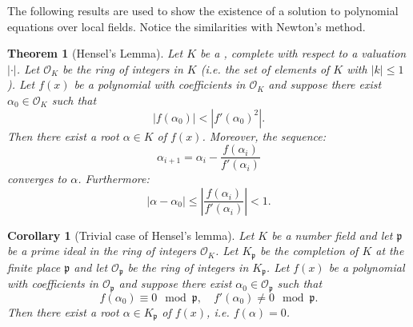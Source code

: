 \documentclass[12pt]{article}
\newtheorem*{thm}{Theorem}
\newtheorem*{cor}{Corollary}
\theoremstyle{definition}
\newcommand{\p}{\mathfrak{p}}
\begin{document}
The following results are used to show the existence of a solution to polynomial equations over local fields. Notice the similarities with Newton's method.

\begin{thm}[Hensel's Lemma]
Let $K$ be a , complete with respect to a valuation $|\cdot|$. Let $\mathcal{O}_K$ be the ring of integers in $K$ (i.e. the set of elements of $K$ with $|k| \leq 1$). Let $f(x)$ be a polynomial with coefficients in $\mathcal{O}_K$ and suppose there exist $\alpha_0\in \mathcal{O}_K$ such that 
$$|f(\alpha_0)| < |f'(\alpha_0)^2|.$$
Then there exist a root $\alpha\in K$ of $f(x)$. Moreover, the sequence:
$$\alpha_{i+1}=\alpha_i-\frac{f(\alpha_i)}{f'(\alpha_i)}$$
converges to $\alpha$. Furthermore:
$$|\alpha-\alpha_0|\leq \left|\frac{f(\alpha_i)}{f'(\alpha_i)}\right| < 1.$$
\end{thm}

\begin{cor}[Trivial case of Hensel's lemma]
Let $K$ be a number field and let $\p$ be a prime ideal in the ring of integers $\mathcal{O}_K$. Let $K_{\p}$ be the completion of $K$ at the finite place $\p$ and let $\mathcal{O}_{\p}$ be the ring of integers in $K_{\p}$. Let $f(x)$ be a polynomial with coefficients in $\mathcal{O}_{\p}$ and suppose there exist $\alpha_0\in \mathcal{O}_{\p}$ such that 
$$f(\alpha_0)\equiv 0 \mod \p,\quad  f'(\alpha_0)\neq 0 \mod \p.$$
Then there exist a root $\alpha\in K_\p$ of $f(x)$, i.e. $f(\alpha)=0$.
\end{cor}
\end{document}
